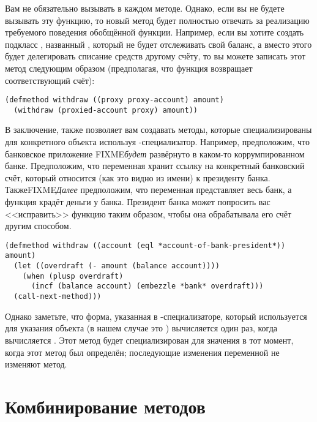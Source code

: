 Вам не обязательно вызывать  в каждом методе.  Однако, если вы не
будете вызывать эту функцию, то новый метод будет полностью отвечать за реализацию
требуемого поведения обобщённой функции.  Например, если вы хотите создать подкласс
, названный , который не будет отслеживать свой
баланс, а вместо этого будет делегировать списание средств другому счёту, то вы можете
записать этот метод следующим образом (предполагая, что функция 
возвращает соответствующий счёт):

\begin{lstlisting}
(defmethod withdraw ((proxy proxy-account) amount)
  (withdraw (proxied-account proxy) amount))
\end{lstlisting}

В заключение,  также позволяет вам создавать методы, которые
специализированы для конкретного объекта используя -специализатор.  Например,
предположим, что банковское приложение FIXME\textit{будет} развёрнуто в каком-то
коррумпированном банке.  Предположим, что переменная 
хранит ссылку на конкретный банковский счёт, который относится (как это видно из имени) к
президенту банка.  ТакжеFIXME\textit{Далее} предположим, что переменная 
представляет весь банк, а функция  крадёт деньги у банка.  Президент банка
может попросить вас <<исправить>> функцию  таким образом, чтобы она
обрабатывала его счёт другим способом.

\begin{lstlisting}
(defmethod withdraw ((account (eql *account-of-bank-president*)) amount)
  (let ((overdraft (- amount (balance account))))
    (when (plusp overdraft)
      (incf (balance account) (embezzle *bank* overdraft)))
  (call-next-method)))
\end{lstlisting}

Однако заметьте, что форма, указанная в -специализаторе, который используется
для указания объекта (в нашем случае это ) вычисляется
один раз, когда вычисляется .  Этот метод будет специализирован для
значения  в тот момент, когда этот метод был определён;
последующие изменения переменной не изменяют метод.

\section{Комбинирование методов}


